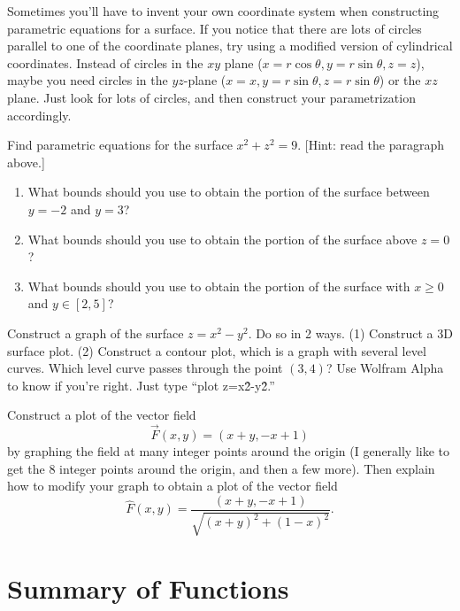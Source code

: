 Sometimes you'll have to invent your own coordinate system when constructing parametric equations for a surface.  If you notice that there are lots of circles parallel to one of the coordinate planes, try using a modified version of cylindrical coordinates. Instead of circles in the $xy$ plane ($x=r\cos\theta,y=r\sin\theta,z=z$), maybe you need circles in the $yz$-plane ($x=x,y=r\sin\theta,z=r\sin\theta$) or the $xz$ plane.  Just look for lots of circles, and then construct your parametrization accordingly.
\begin{challenge}
%
Find parametric equations for the surface $x^2+z^2=9$. [Hint: read the paragraph above.]  
\begin{enumerate}
 \item{}%
 What bounds should you use to obtain the portion of the surface between $y=-2$ and $y=3$?
 \item What bounds should you use to obtain the portion of the surface above $z=0$?
 \item What bounds should you use to obtain the portion of the surface with $x\geq 0$ and $y\in[2,5]$?
\end{enumerate}
\end{challenge}

\begin{challenge}
 Construct a graph of the surface $z = x^2-y^2$.  Do so in 2 ways.  (1) Construct a 3D surface plot.  (2) Construct a contour plot, which is a graph with several level curves. Which level curve passes through the point $(3,4)$? 
 Use Wolfram Alpha to know if you're right.  Just type ``plot z=x\^2-y\^2.''
\end{challenge}

\begin{challenge}
Construct a plot of the vector field $$\vec F(x,y) = (x+y, -x+1)$$ by graphing the field at many integer points around the origin (I generally like to get the 8 integer points around the origin, and then a few more).
Then explain how to modify your graph to obtain a plot of the vector field $$\hat F(x,y) = \frac{(x+y, -x+1)}{\sqrt{(x+y)^2+(1-x)^2}}.$$ 
\end{challenge}

\newpage

\section{Summary of Functions}\label{sec:functionlist}

